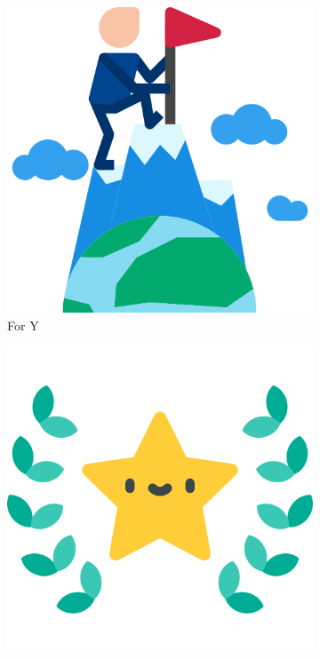 \documentclass[12 pct]{report}
\begin{document}
\begin{figure}[H]
\begin{subfigure}[b]{0.3\linewidth}
  \end{subfigure}
  \begin{subfigure}[b]{0.3\linewidth}
    \includegraphics[width=\linewidth]{ArRobotCodeAchiv2}
    \caption{For Y}
  \end{subfigure}
  \begin{subfigure}[b]{0.3\linewidth}
    \includegraphics[width=\linewidth]{ArRobotCodeAchiv3}

\end{subfigure}
\end{figure}
\end{document}

